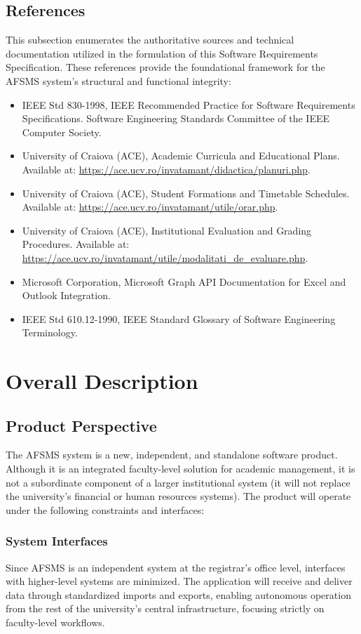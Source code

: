 \documentclass[11pt, a4paper]{article}
\begin{document}
\subsection{References}
This subsection enumerates the authoritative sources and technical documentation utilized in the formulation of this Software Requirements Specification. These references provide the foundational framework for the AFSMS system's structural and functional integrity:
\begin{itemize}
    \item IEEE Std 830-1998, IEEE Recommended Practice for Software Requirements Specifications. Software Engineering Standards Committee of the IEEE Computer Society.
    \item University of Craiova (ACE), Academic Curricula and Educational Plans. Available at: \url{https://ace.ucv.ro/invatamant/didactica/planuri.php}.
    \item University of Craiova (ACE), Student Formations and Timetable Schedules. Available at: \url{https://ace.ucv.ro/invatamant/utile/orar.php}.
    \item University of Craiova (ACE), Institutional Evaluation and Grading Procedures. Available at: \url{https://ace.ucv.ro/invatamant/utile/modalitati_de_evaluare.php}.
    \item Microsoft Corporation, Microsoft Graph API Documentation for Excel and Outlook Integration.
    \item IEEE Std 610.12-1990, IEEE Standard Glossary of Software Engineering Terminology.
\end{itemize}


\section{Overall Description}

\subsection{Product Perspective}
The AFSMS system is a new, independent, and standalone software product. Although it is an integrated faculty-level solution for academic management, it is not a subordinate component of a larger institutional system (it will not replace the university's financial or human resources systems). The product will operate under the following constraints and interfaces:

\subsubsection{System Interfaces}
Since AFSMS is an independent system at the registrar's office level, interfaces with higher-level systems are minimized. The application will receive and deliver data through standardized imports and exports, enabling autonomous operation from the rest of the university's central infrastructure, focusing strictly on faculty-level workflows.
\end{document}
